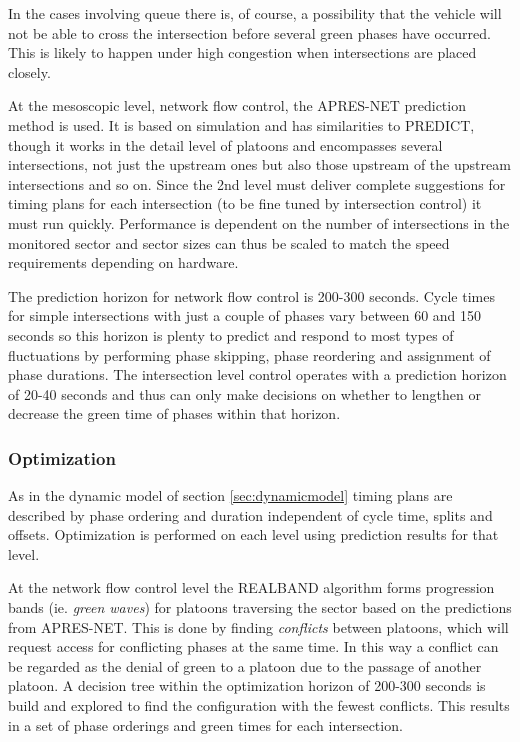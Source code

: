 In the cases involving queue there is, of course, a possibility that
the vehicle will not be able to cross the intersection before several
green phases have occurred. This is likely to happen under high
congestion when intersections are placed closely.

At the mesoscopic level, network flow control, the APRES-NET
prediction method is used. It is based on simulation and has
similarities to PREDICT, though it works in the detail level of
platoons and encompasses several intersections, not just the upstream
ones but also those upstream of the upstream intersections and so
on. Since the 2nd level must deliver complete suggestions for timing
plans for each intersection (to be fine tuned by intersection control)
it must run quickly. Performance is dependent on the number of
intersections in the monitored sector and sector sizes can thus be
scaled to match the speed requirements depending on hardware.

The prediction horizon for network flow control is 200-300
seconds. Cycle times for simple intersections with just a couple of
phases vary between 60 and 150 seconds so this horizon is plenty to
predict and respond to most types of fluctuations by performing phase
skipping, phase reordering and assignment of phase durations. The
intersection level control operates with a prediction horizon of 20-40
seconds and thus can only make decisions on whether to lengthen or
decrease the green time of phases within that horizon.

\subsubsection*{Optimization}
As in the dynamic model of section \ref{sec:dynamicmodel} timing plans are
described by phase ordering and duration independent of cycle time,
splits and offsets.  Optimization is performed on each level using
prediction results for that level.

At the network flow control level the REALBAND algorithm forms
progression bands (ie. \textit{green waves}) for platoons traversing
the sector based on the predictions from APRES-NET. This is done by
finding \textit{conflicts} between platoons, which will request access
for conflicting phases at the same time. In this way a conflict can be
regarded as the denial of green to a platoon due to the passage of
another platoon. A decision tree within the optimization horizon of
200-300 seconds is build and explored to find the configuration with
the fewest conflicts. This results in a set of phase orderings and
green times for each intersection.

